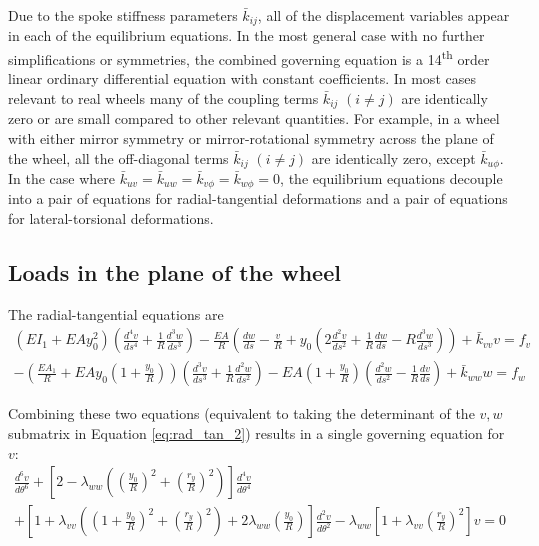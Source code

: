 \documentclass[../thesis.tex]{subfiles}
\newcommand{\ds}[2]{\frac{d^#2#1}{ds^#2}}
\newcommand{\dt}[2]{\frac{d^#2#1}{d\theta^#2}}
\begin{document}
Due to the spoke stiffness parameters $\bar{k}_{ij}$, all of the displacement variables appear in each of the equilibrium equations. In the most general case with no further simplifications or symmetries, the combined governing equation is a 14\textsuperscript{th} order linear ordinary differential equation with constant coefficients. In most cases relevant to real wheels many of the coupling terms $\bar{k}_{ij}$ $(i \neq j)$ are identically zero or are small compared to other relevant quantities. For example, in a wheel with either mirror symmetry or mirror-rotational symmetry across the plane of the wheel, all the off-diagonal terms $\bar{k}_{ij}$ $(i \neq j)$ are identically zero, except $\bar{k}_{u\phi}$. In the case where $\bar{k}_{uv}=\bar{k}_{uw}=\bar{k}_{v\phi}=\bar{k}_{w\phi}=0$, the equilibrium equations decouple into a pair of equations for radial-tangential deformations and a pair of equations for lateral-torsional deformations.

\subsection{Loads in the plane of the wheel}

The radial-tangential equations are
\begin{subequations}
\begin{align}
\label{eq:rad_tan_2}
(EI_1 + EAy_0^2)\left( \ds{v}{4} + \frac{1}{R}\ds{w}{3} \right) -
    \frac{EA}{R}\left( \frac{dw}{ds} - \frac{v}{R} +y_0\left(2\ds{v}{2} + \frac{1}{R}\frac{dw}{ds} -
    R\ds{w}{3}\right) \right) +\bar{k}_{vv}v = f_v\\
-\left( \frac{EA_1}{R} + EAy_0\left( 1 + \frac{y_0}{R} \right) \right)
    \left(\ds{v}{3} + \frac{1}{R}\ds{w}{2} \right) -
    EA\left(1+\frac{y_0}{R} \right) \left(\ds{w}{2} - \frac{1}{R}\frac{dv}{ds} \right) + \bar{k}_{ww}w = f_w
\end{align}
\end{subequations}

Combining these two equations (equivalent to taking the determinant of the $v,w$ submatrix in Equation \eqref{eq:rad_tan_2}) results in a single governing equation for $v$:
\begin{multline}
\label{eq:rad_tan_ry}
\dt{v}{6} + \left[2-\lambda_{ww}\left(\left(\frac{y_0}{R}\right)^2 +
                                        \left(\frac{r_y}{R}\right)^2 \right) \right] \dt{v}{4}\\
          + \left[1+\lambda_{vv}\left(\left(1+\frac{y_0}{R}\right)^2+\left(\frac{r_y}{R}\right)^2\right)
                   +2\lambda_{ww}\left(\frac{y_0}{R}\right)\right]\dt{v}{2}
          - \lambda_{ww}\left[1+\lambda_{vv}\left(\frac{r_y}{R}\right)^2\right] v = 0
\end{multline}
\end{document}
